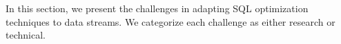 \label {sec:fs-optimization-challenges}
In this section, we present the challenges in adapting SQL optimization techniques to data streams. We categorize each challenge as either research or technical. 